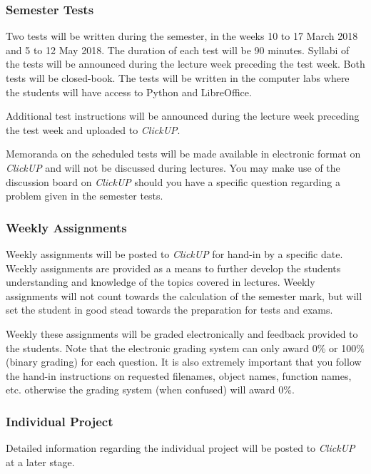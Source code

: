     \subsubsection{Semester Tests}
        Two tests will be written during the semester, in the weeks 10
        to 17 March 2018 and 5 to 12 May 2018. The duration of each test will
        be 90 minutes. Syllabi of the tests will be announced during the
        lecture week preceding the test week. Both tests will be closed-book.
        The tests will be written in the computer labs where the students will
        have access to Python and LibreOffice.

        Additional test instructions will be announced during the lecture
        week preceding the test week and uploaded to {\it ClickUP}.

        Memoranda on the scheduled tests will be made available in electronic
        format on {\it ClickUP} and will not be discussed during lectures. You
        may make use of the discussion board on {\it ClickUP} should you have a
        specific question regarding a problem given in the semester tests.

    \subsubsection{Weekly Assignments}
        Weekly assignments will be posted to \textit{ClickUP} for hand-in by a
        specific date. Weekly assignments are provided as a means to further
        develop the students understanding and knowledge of the topics covered
        in lectures. Weekly assignments will not count towards the calculation
        of the semester mark, but will set the student in good stead towards
        the preparation for tests and exams.

        Weekly these assignments will be graded electronically and feedback
        provided to the students. Note that the electronic grading
        system can only award 0\% or 100\% (binary grading) for each question.
        It is also extremely important that you follow the hand-in instructions
        on requested filenames, object names, function names, etc. otherwise
        the grading system (when confused) will award 0\%.

    \subsubsection{Individual Project}
        Detailed information regarding the individual project will be posted to
        {\it ClickUP} at a later stage.

